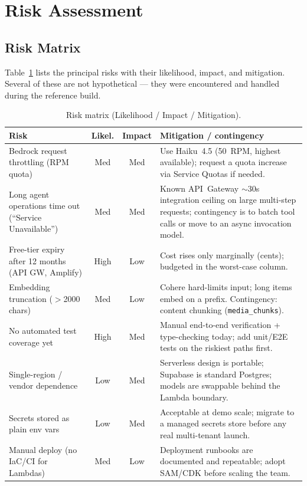 \documentclass[a4paper,11pt]{article}
\begin{document}
	\section{Risk Assessment}
	\label{sec:risk}

	\subsection{Risk Matrix}
	Table~\ref{tab:risk} lists the principal risks with their likelihood, impact, and
	mitigation. Several of these are not hypothetical --- they were encountered and handled
	during the reference build.

	\begin{table}[H]
		\centering
		\footnotesize
		\begin{tabularx}{\textwidth}{@{}p{3.4cm} c c X@{}}
			\toprule
			\textbf{Risk} & \textbf{Likel.} & \textbf{Impact} & \textbf{Mitigation / contingency} \\
			\midrule
			Bedrock request throttling (RPM quota) & Med & Med & Use Haiku~4.5 (50~RPM, highest available); request a quota increase via Service Quotas if needed. \\
			Long agent operations time out (``Service Unavailable'') & Med & Med & Known API~Gateway $\sim$30s integration ceiling on large multi-step requests; contingency is to batch tool calls or move to an async invocation model. \\
			Free-tier expiry after 12 months (API GW, Amplify) & High & Low & Cost rises only marginally (cents); budgeted in the worst-case column. \\
			Embedding truncation ($>$2000 chars) & Med & Low & Cohere hard-limits input; long items embed on a prefix. Contingency: content chunking (\texttt{media\_chunks}). \\
			No automated test coverage yet & High & Med & Manual end-to-end verification + type-checking today; add unit/E2E tests on the riskiest paths first. \\
			Single-region / vendor dependence & Low & Med & Serverless design is portable; Supabase is standard Postgres; models are swappable behind the Lambda boundary. \\
			Secrets stored as plain env vars & Low & Med & Acceptable at demo scale; migrate to a managed secrets store before any real multi-tenant launch. \\
			Manual deploy (no IaC/CI for Lambdas) & Med & Low & Deployment runbooks are documented and repeatable; adopt SAM/CDK before scaling the team. \\
			\bottomrule
		\end{tabularx}
		\caption{Risk matrix (Likelihood / Impact / Mitigation).}
		\label{tab:risk}
	\end{table}
\end{document}
